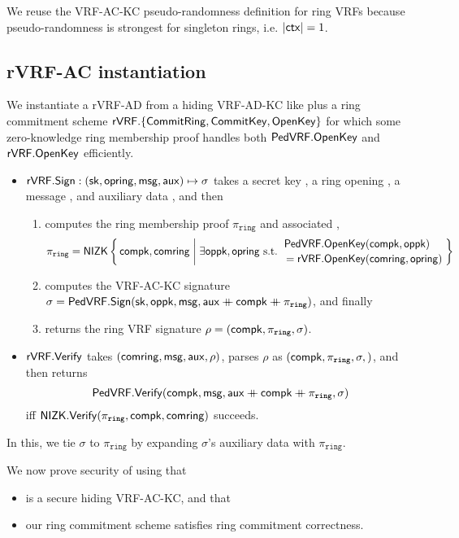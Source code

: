 We reuse the VRF-AC-KC pseudo-randomness definition for ring VRFs
because pseudo-randomness is strongest for singleton rings, i.e. $|\mathsf{ctx}| = 1$.


\subsection{rVRF-AC instantiation}

We instantiate a rVRF-AD from a hiding VRF-AD-KC like \PedVRF plus
a ring commitment scheme
 ${\mathsf{rVRF}}.\{ {\mathsf{CommitRing}}, {\mathsf{CommitKey}}, {\mathsf{OpenKey}} \}$
for which some zero-knowledge ring membership proof handles both
 ${\mathsf{PedVRF}}.{\mathsf{OpenKey}}$ and ${\mathsf{rVRF}}.{\mathsf{OpenKey}}$
efficiently.

\newcommand\piring{\ensuremath{\pi_{\mathtt{ring}}}\xspace}

\begin{itemize}
\item ${\mathsf{rVRF}}.{\mathsf{Sign}} : (\mathsf{sk},\mathsf{opring},\mathsf{msg},\mathsf{aux}) \mapsto \sigma$ takes
 a secret key \sk, a ring opening \openring, a message \msg, and auxiliary data \aux, and then \\
 \begin{enumerate}
 \item computes the ring membership proof $\piring$ and associated \openpk,
  $$ \piring = \NIZK \Setst{ \compk, \comring }{
  \exists \openpk,\openring \textrm{\ s.t.\ } 
  \genfrac{}{}{0pt}{}{\PedVRF.\OpenKey(\compk,\openpk) \quad}{\,\, = \rVRF.\OpenKey(\comring,\openring)}
  } $$
 \item computes the VRF-AC-KC signature
  $\sigma = \PedVRF.\Sign(\sk,\openpk,\msg,\aux \doubleplus \compk \doubleplus \piring)$, and finally
 \item returns the ring VRF signature $\rho = (\compk,\piring,\sigma)$.
 \end{enumerate}
\item ${\mathsf{rVRF}}.{\mathsf{Verify}}$ takes $(\mathsf{comring},\mathsf{msg},\mathsf{aux},\rho)$,
 parses $\rho$ as $(\compk,\piring,\sigma,)$,  and then returns
 $$ \PedVRF.\Verify(\compk,\msg,\aux \doubleplus \compk \doubleplus \piring,\sigma) $$
 iff $\NIZK.\Verify(\piring,\compk,\comring)$ succeeds. 
\end{itemize}

In this, we tie $\sigma$ to $\piring$ by expanding $\sigma$'s auxiliary data with $\piring$.

\smallskip

We now prove security of \rVRF using that
\begin{itemize}
\item \PedVRF is a secure hiding VRF-AC-KC, and that
\item our ring commitment scheme satisfies ring commitment correctness.
\end{itemize}

